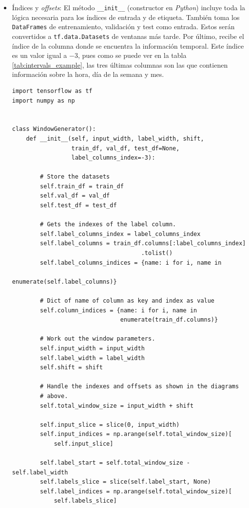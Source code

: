 \begin{itemize}
    \item Índices y \textit{offsets}:  El método \small{\verb|__init__|} (constructor en \textit{Python}) incluye toda la lógica necesaria para los índices de entrada y de etiqueta. También toma los \small{\verb|DataFrames|} de entrenamiento, validación y test como entrada. Estos serán convertidos a \small{\verb|tf.data.Datasets|} de ventanas más tarde. Por último, recibe el índice de la columna donde se encuentra la información temporal. Este índice es un valor igual a $-3$, pues como se puede ver en la tabla \ref{tab:intervals_example}, las tres últimas columnas son las que contienen información sobre la hora, día de la semana y mes.

\begin{verbatim}
import tensorflow as tf
import numpy as np


class WindowGenerator():
    def __init__(self, input_width, label_width, shift,
                 train_df, val_df, test_df=None,
                 label_columns_index=-3):

        # Store the datasets
        self.train_df = train_df
        self.val_df = val_df
        self.test_df = test_df

        # Gets the indexes of the label column.
        self.label_columns_index = label_columns_index
        self.label_columns = train_df.columns[:label_columns_index]
                                     .tolist()
        self.label_columns_indices = {name: i for i, name in
                                      enumerate(self.label_columns)}
    
        # Dict of name of column as key and index as value
        self.column_indices = {name: i for i, name in
                               enumerate(train_df.columns)}

        # Work out the window parameters.
        self.input_width = input_width
        self.label_width = label_width
        self.shift = shift
        
        # Handle the indexes and offsets as shown in the diagrams
        # above.
        self.total_window_size = input_width + shift

        self.input_slice = slice(0, input_width)
        self.input_indices = np.arange(self.total_window_size)[
            self.input_slice]

        self.label_start = self.total_window_size - self.label_width
        self.labels_slice = slice(self.label_start, None)
        self.label_indices = np.arange(self.total_window_size)[
            self.labels_slice]
\end{verbatim}


\end{itemize}
